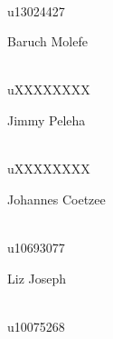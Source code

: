 \documentclass[a4paper,12pt]{report}
\begin{document}
\begin{titlepage}
\begin{center}
\begin{minipage}{0.4\textwidth}
\end{minipage}
\begin{minipage}{0.4\textwidth}
\begin{flushright} \large
\emph{} \\
u13024427
\end{flushright}
\end{minipage}
\begin{minipage}{0.4\textwidth}
\begin{flushleft} \large
Baruch {Molefe}
\end{flushleft}
\end{minipage}
\begin{minipage}{0.4\textwidth}
\begin{flushright} \large
\emph{} \\
uXXXXXXXX
\end{flushright}
\end{minipage}
\begin{minipage}{0.4\textwidth}
\begin{flushleft} \large
Jimmy {Peleha}
\end{flushleft}
\end{minipage}
\begin{minipage}{0.4\textwidth}
\begin{flushright} \large
\emph{} \\
uXXXXXXXX
\end{flushright}
\end{minipage}
\begin{minipage}{0.4\textwidth}
\begin{flushleft} \large
Johannes {Coetzee}
\end{flushleft}
\end{minipage}
\begin{minipage}{0.4\textwidth}
\begin{flushright} \large
\emph{} \\
u10693077
\end{flushright}
\end{minipage}
\begin{minipage}{0.4\textwidth}
\begin{flushleft} \large
Liz {Joseph}
\end{flushleft}
\end{minipage}
\begin{minipage}{0.4\textwidth}
\begin{flushright} \large
\emph{} \\
u10075268
\end{flushright}

\end{minipage}
\end{center}
\end{titlepage}
\end{document}
